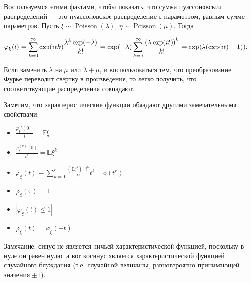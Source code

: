 \documentclass[12pt]{article}
\DeclarePairedDelimiter\autobracket{(}{)}
\newcommand{\br}[1]{\autobracket*{#1}}
\newcommand{\E}{\mathbb{E}}
\begin{document}
Воспользуемся этими фактами, чтобы показать, что сумма пуассоновских распределений — это пуассоновское распределение с параметром, равным сумме параметров. Пусть $\xi \sim \operatorname{Poisson}(\lambda)$, $\eta \sim \operatorname{Poisson}(\mu)$. Тогда

\[
\varphi_\xi(t) = \sum_{k = 0}^\infty \exp(i t k) \frac {\lambda^k \exp(-\lambda)} {k!} = \exp (-\lambda) \sum_{k=0}^\infty \frac {\br{\lambda \exp(it)}^k} {k!} = \exp(\lambda (\exp(it) - 1)).
\]

Если заменить $\lambda$ на $\mu$ или $\lambda + \mu$, и воспользоваться тем, что преобразование Фурье переводит свёртку в произведение, то легко получить, что соответствующие распределения совпадают.

Заметим, что характеристические функции обладают другими замечательными свойствами:

\begin{itemize}
\item $\frac {\varphi_\xi' (0)} {i} = \E \xi$
\item $\frac {\varphi_\xi^{(k)} (0)} {i^k} = \E \xi^k$
\item $\varphi_\xi (t) = \sum_{k = 0}^r \frac {(\E \xi^k) \cdot i^k} {k!} t^k + \overline{o} (t^r)$
\item $\varphi_\xi(0) = 1$
\item $|\varphi_\xi (t) \leq 1|$
\item $\overline{\varphi_\xi (t)} = \varphi_\xi (-t)$
\end{itemize}

Замечание: синус не является ничьей характеристической функцией, поскольку в нуле он равен нулю, а вот косинус является характеристической функцией случайного блуждания (т.е. случайной величины, равновероятно принимающей значения $\pm 1$).
\end{document}
